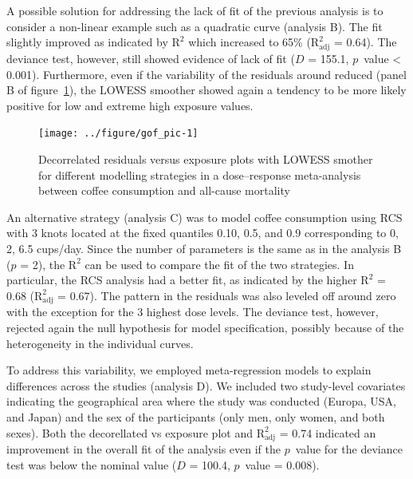 \documentclass[11pt,a4paper,twoside,openany]{book}\usepackage{knitr}
\begin{document}
{\noindent A possible solution for addressing the lack of fit of the previous analysis is to consider a non-linear example such as a quadratic curve (analysis B). The fit slightly improved as indicated by \textrm{$\mathrm{R^2}$} which increased to 65\% (\textrm{$\mathrm{R_{\textrm{adj}}^2}$} = 0.64). The deviance test, however, still showed evidence of lack of fit ($D$ = 155.1, $p$~value < 0.001). Furthermore, even if the variability of the residuals around reduced (panel B of figure~\ref{fig:gof_pic}), the LOWESS smoother showed again a tendency to be more likely positive for low and extreme high exposure values.

\begin{knitrout}\footnotesize
{}\color{fgcolor}\begin{figure}[ht!]

{\centering \texttt{[image: ../figure/gof\_pic-1]} 

}

\caption[Decorrelated residuals versus exposure plots with LOWESS smother for different modelling strategies in a dose--response meta-analysis between coffee consumption and all-cause mortality \citep{crippa2014coffee}]{Decorrelated residuals versus exposure plots with LOWESS smother for different modelling strategies in a dose--response meta-analysis between coffee consumption and all-cause mortality \citep{crippa2014coffee}}\label{fig:gof_pic}
\end{figure}


\end{knitrout}

\noindent An alternative strategy (analysis C) was to model coffee consumption using RCS with 3 knots located at the fixed quantiles 0.10, 0.5, and 0.9 corresponding to 0, 2, 6.5 cups/day. Since the number of parameters is the same as in the analysis B ($p$ = 2), the \textrm{$\mathrm{R^2}$} can be used to compare the fit of the two strategies. In particular, the RCS analysis had a better fit, as indicated by the higher \textrm{$\mathrm{R^2}$} = 0.68 (\textrm{$\mathrm{R_{\textrm{adj}}^2}$} = 0.67). The pattern in the residuals was also leveled off around zero with the exception for the 3 highest dose levels. The deviance test, however, rejected again the null hypothesis for model specification, possibly because of the heterogeneity in the individual curves. 

\noindent To address this variability, we employed meta-regression models to explain differences across the studies (analysis D). We included two study-level covariates indicating the geographical area where the study was conducted (Europa, USA, and Japan) and the sex of the participants (only men, only women, and both sexes). Both the decorellated vs exposure plot and \textrm{$\mathrm{R_{\textrm{adj}}^2}$} = 0.74 indicated an improvement in the overall fit of the analysis even if the $p$~value for the deviance test was below the nominal value ($D$ = 100.4, $p$~value = 0.008).

}
\end{document}
